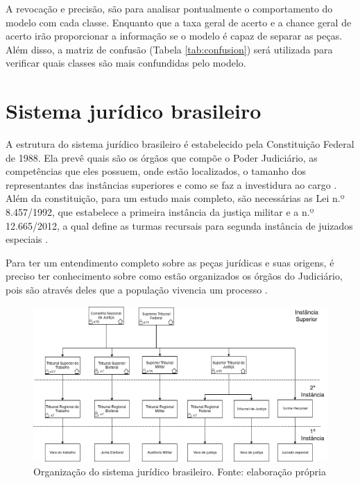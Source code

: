 A revocação e precisão, são para analisar pontualmente o comportamento do modelo com cada classe. Enquanto que a taxa geral de acerto e a chance geral de acerto irão proporcionar a informação se o modelo é capaz de separar as peças. Além disso, a matriz de confusão (Tabela \ref{tab:confusion}) será utilizada para verificar quais classes são mais confundidas pelo modelo.

\section{Sistema jurídico brasileiro}

A estrutura do sistema jurídico brasileiro é estabelecido pela Constituição Federal de 1988. Ela prevê quais são os órgãos que compõe o Poder Judiciário, as competências que eles possuem, onde estão localizados, o tamanho dos representantes das instâncias superiores e como se faz a investidura ao cargo \cite{BRASIL1988}. Além da constituição, para um estudo mais completo, são necessárias as Lei n.º 8.457/1992, que estabelece a primeira instância da justiça militar \cite{BRASIL1992} e a n.º 12.665/2012, a qual define as turmas recursais para segunda instância de juizados especiais \cite{BRASIL2012}.

Para ter um entendimento completo sobre as peças jurídicas e suas origens, é preciso ter conhecimento sobre como estão organizados os órgãos do Judiciário, pois são através deles que a população vivencia um processo \cite{JUNIOR2012}.

\begin{figure}[h]
	\centering
    \includegraphics[keepaspectratio=true,scale=0.4]{figuras/sistemaJudiciario}
	\caption[Sistema judiciário]{Organização do sistema jurídico brasileiro. Fonte: elaboração própria}
	\label{fig:sistemaJudiciario}
\end{figure}

